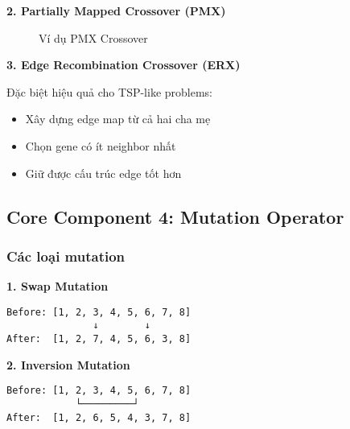 \documentclass[12pt,a4paper]{article}
\begin{document}
\textbf{2. Partially Mapped Crossover (PMX)}

\begin{figure}[h]
\centering
{}
\caption{Ví dụ PMX Crossover}
\end{figure}

\textbf{3. Edge Recombination Crossover (ERX)}

Đặc biệt hiệu quả cho TSP-like problems:
\begin{itemize}
    \item Xây dựng edge map từ cả hai cha mẹ
    \item Chọn gene có ít neighbor nhất
    \item Giữ được cấu trúc edge tốt hơn
\end{itemize}

\subsection{Core Component 4: Mutation Operator}

\subsubsection{Các loại mutation}

\textbf{1. Swap Mutation}
\begin{verbatim}
Before: [1, 2, 3, 4, 5, 6, 7, 8]
               ↓        ↓
After:  [1, 2, 7, 4, 5, 6, 3, 8]
\end{verbatim}

\textbf{2. Inversion Mutation}
\begin{verbatim}
Before: [1, 2, 3, 4, 5, 6, 7, 8]
            └─────────┘
After:  [1, 2, 6, 5, 4, 3, 7, 8]
\end{verbatim}
\end{document}
